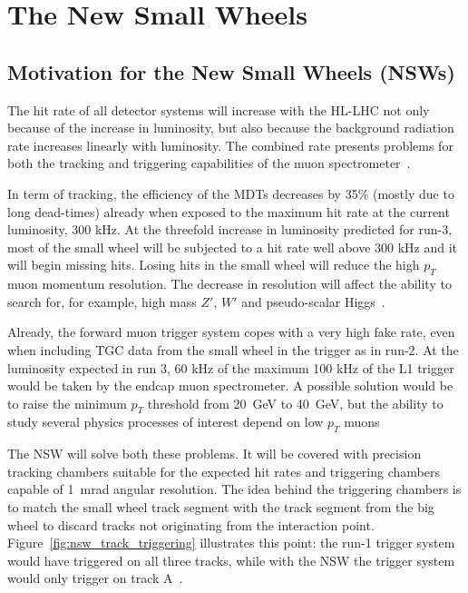 
\chapter{The New Small Wheels}
\label{chap:nsw}

\section{Motivation for the New Small Wheels (NSWs)}

The hit rate of all detector systems will increase with the HL-LHC not only because of the increase in luminosity, but also because the background radiation rate increases linearly with luminosity.
The combined rate presents problems for both the tracking and triggering capabilities of the muon spectrometer~\cite{nsw_tdr}.

In term of tracking, the efficiency of the MDTs decreases by 35\% (mostly due to long dead-times) already when exposed to the maximum hit rate at the current luminosity, 300 kHz.
At the threefold increase in luminosity predicted for run-3, most of the small wheel will be subjected to a hit rate well above 300 kHz and it will begin missing hits. Losing hits in the small wheel will reduce the high $p_T$ muon momentum resolution. The decrease in resolution will affect the ability to search for, for example, high mass $Z'$, $W'$ and pseudo-scalar Higgs~\cite{nsw_tdr}.

Already, the forward muon trigger system copes with a very high fake rate, even when including TGC data from the small wheel in the trigger as in run-2. At the luminosity expected in run 3, 60 kHz of the maximum 100 kHz of the L1 trigger would be taken by the endcap muon spectrometer. A possible solution would be to raise the minimum $p_T$ threshold from \SI{20}{\giga\electronvolt} to \SI{40}{\giga\electronvolt}, but the ability to study several physics processes of interest depend on low $p_T$ muons~\cite{nsw_tdr}

The NSW will solve both these problems. It will be covered with precision tracking chambers suitable for the expected hit rates and triggering chambers capable of \SI{1}{mrad} angular resolution. The idea behind the triggering chambers is to match the small wheel track segment with the track segment from the big wheel to discard tracks not originating from the interaction point. Figure~\ref{fig:nsw_track_triggering} illustrates this point: the run-1 trigger system would have triggered on all three tracks, while with the NSW the trigger system would only trigger on track A~\cite{nsw_tdr}.

